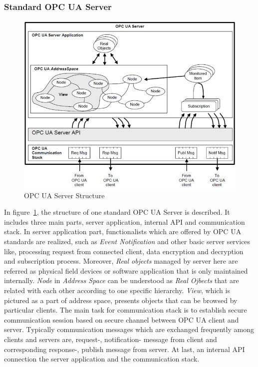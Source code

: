 \documentclass[]{llncs}
\begin{document}
\subsubsection{Standard OPC UA Server}
\begin{figure}[t]
	\centering
	\includegraphics[width=1\textwidth]{server.jpg}
		\caption[ ]{OPC UA Server Structure\cite{O1}}
	\label{fig:server}
\end{figure}
In figure~\ref{fig:server}, the structure of one standard OPC UA Server is described. It includes three main parts, server application, internal API and communication stack. In server application part,  functionalists which are offered by OPC UA standards are realized, such as \emph{Event Notification} and other basic server services like, processing request from connected client, data encryption and decryption and subscription process. Moreover, \emph{Real objects} managed by server here are referred as physical field devices or software application that is only maintained internally. \emph{Node} in \emph{Address Space} can be understood as \emph{Real Ojbects} that are related with each other according to one specific hierarchy.  \emph{View}, which is pictured as a part of address space, presents objects that can be browsed by particular clients. The main  task for  communication stack  is to establish secure communication session based on secure channel between OPC UA client and server.   Typically communication messages which are exchanged frequently among clients and servers are, request-, notification- message from client and   corresponding   response-, publish message from server. At last, an internal API connection the server application and the communication stack.
\end{document}
